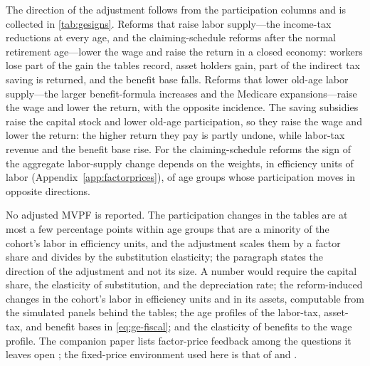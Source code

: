 The direction of the adjustment follows from the participation columns and is collected in \autoref{tab:gesigns}. Reforms that raise labor supply---the income-tax reductions at every age, and the claiming-schedule reforms after the normal retirement age---lower the wage and raise the return in a closed economy: workers lose part of the gain the tables record, asset holders gain, part of the indirect tax saving is returned, and the benefit base falls. Reforms that lower old-age labor supply---the larger benefit-formula increases and the Medicare expansions---raise the wage and lower the return, with the opposite incidence. The saving subsidies raise the capital stock and lower old-age participation, so they raise the wage and lower the return: the higher return they pay is partly undone, while labor-tax revenue and the benefit base rise. For the claiming-schedule reforms the sign of the aggregate labor-supply change depends on the weights, in efficiency units of labor (Appendix~\ref{app:factorprices}), of age groups whose participation moves in opposite directions. %

No adjusted MVPF is reported. The participation changes in the tables are at most a few percentage points within age groups that are a minority of the cohort's labor in efficiency units, and the adjustment scales them by a factor share and divides by the substitution elasticity; the paragraph states the direction of the adjustment and not its size. A number would require the capital share, the elasticity of substitution, and the depreciation rate; the reform-induced changes in the cohort's labor in efficiency units and in its assets, computable from the simulated panels behind the tables; the age profiles of the labor-tax, asset-tax, and benefit bases in \eqref{eq:ge-fiscal}; and the elasticity of benefits to the wage profile. The companion paper lists factor-price feedback among the questions it leaves open \citep{ndiaye2026flexible}; the fixed-price environment used here is that of \citet{farhi2013insurance} and \citet{golosov2016redistribution}. %
